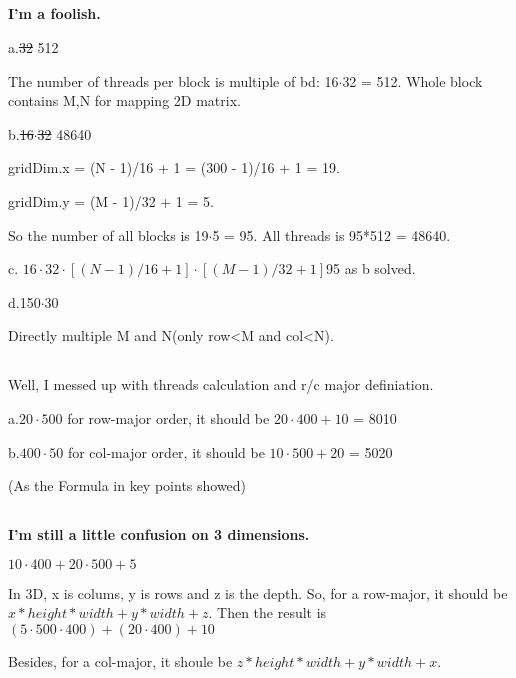 \documentclass{article}
\begin{document}
\subsection{}
\textbf{I'm a foolish.}

a.\sout{32} 512

The number of threads per block is multiple of bd: 16$\cdot$32 = 512.
Whole block contains M,N for mapping 2D matrix.

b.\sout{16$\cdot$32} 48640

gridDim.x = (N - 1)/16 + 1 = (300 - 1)/16 + 1 = 19.

gridDim.y = (M - 1)/32 + 1 = 5.

So the number of all blocks is 19$\cdot$5 = 95. All threads is 95*512 = 48640.

c. \sout{$16\cdot32\cdot[(N-1)/16+1]\cdot[(M-1)/32+1]$}95 as b solved.

d.150$\cdot$30

Directly multiple M and N(only row<M and col<N).

\subsection{}
Well, I messed up with threads calculation and r/c major definiation.

a.\sout{$20\cdot500$}
for row-major order, it should be \(20\cdot400+10\) = 8010

b.\sout{$400\cdot50$}
for col-major order, it should be \(10\cdot500+20\) = 5020

(As the Formula in key points showed)

\subsection{}
\textbf{I'm still a little confusion on 3 dimensions.}

\sout{\(10\cdot400+20\cdot500+5\)}

In 3D, x is colums, y is rows and z is the depth. So, for a row-major, it should be \(x*height*width+y*width+z\).
Then the result is \((5\cdot500\cdot400)+(20\cdot400)+10\)

Besides, for a col-major, it shoule be \(z*height*width+y*width+x\).
\end{document}

